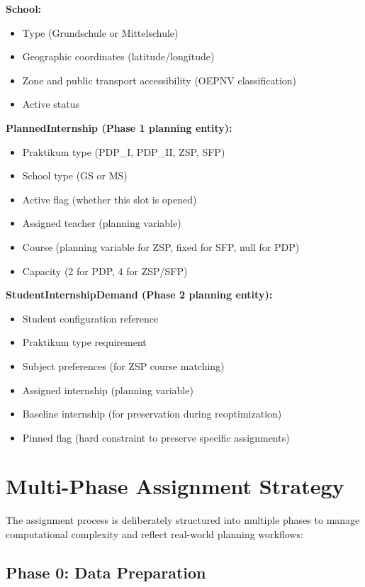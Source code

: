 \documentclass[12pt,a4paper]{report}
\begin{document}
\textbf{School:}
\begin{itemize}
    \item Type (Grundschule or Mittelschule)
    \item Geographic coordinates (latitude/longitude)
    \item Zone and public transport accessibility (OEPNV classification)
    \item Active status
\end{itemize}

\textbf{PlannedInternship (Phase 1 planning entity):}
\begin{itemize}
    \item Praktikum type (PDP\_I, PDP\_II, ZSP, SFP)
    \item School type (GS or MS)
    \item Active flag (whether this slot is opened)
    \item Assigned teacher (planning variable)
    \item Course (planning variable for ZSP, fixed for SFP, null for PDP)
    \item Capacity (2 for PDP, 4 for ZSP/SFP)
\end{itemize}

\textbf{StudentInternshipDemand (Phase 2 planning entity):}
\begin{itemize}
    \item Student configuration reference
    \item Praktikum type requirement
    \item Subject preferences (for ZSP course matching)
    \item Assigned internship (planning variable)
    \item Baseline internship (for preservation during reoptimization)
    \item Pinned flag (hard constraint to preserve specific assignments)
\end{itemize}

\section{Multi-Phase Assignment Strategy}

The assignment process is deliberately structured into multiple phases to manage computational complexity and reflect real-world planning workflows:

\subsection{Phase 0: Data Preparation}
\end{document}
